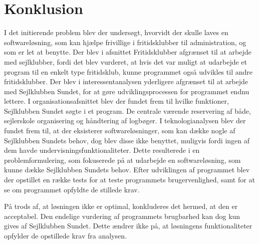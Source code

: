 \chapter{Konklusion} 
I det initierende problem blev der undersøgt, hvorvidt der skulle laves en softwareløsning, som kan hjælpe frivillige i fritidsklubber til administration, og som er let at benytte. 
Der blev i afsnittet Fritidsklubber afgrænset til at arbejde med sejlklubber, fordi det blev vurderet, at hvis det var muligt at udarbejde et program til en enkelt type fritidsklub, kunne programmet også udvikles til andre fritidsklubber. 
Der blev i interessentanalysen yderligere afgrænset til at arbejde med Sejlklubben Sundet, for at gøre udviklingsprocessen for programmet endnu lettere. 
I organisationsafsnittet blev der fundet frem til hvilke funktioner, Sejlklubben Sundet søgte i et program.
De centrale værende reservering af både, sejlerskole organisering og håndtering af logbøger.
I teknologianalysen blev der fundet frem til, at der eksisterer softwareløsninger, som kan dække nogle af Sejlklubben Sundets behov, dog blev disse ikke benyttet, muligvis fordi ingen af dem havde undervisningsfunktionaliteter. 
Dette resulterede i en problemformulering, som fokuserede på at udarbejde en softwareløsning, som kunne dække Sejlklubben Sundets behov. 
Efter udviklingen af programmet blev der opstillet en række tests for at teste programmets brugervenlighed, samt for at se om programmet opfyldte de stillede krav.

På trods af, at løsningen ikke er optimal, konkluderes det hermed, at den er acceptabel. 
Den endelige vurdering af programmets brugbarhed kan dog kun gives af Sejlklubben Sundet.
Dette ændrer ikke på, at løsningens funktionaliteter opfylder de opstillede krav fra analysen. 

